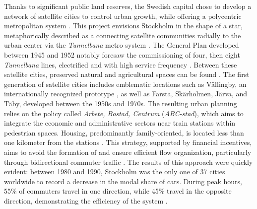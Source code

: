 \begin{refsegment}
{    Thanks to significant public land reserves, the Swedish capital chose to develop a network of satellite cities to control urban growth, while offering a polycentric metropolitan system \textcolor{blue}{\autocite[p.~109-130 (Chapter~4)]{cervero_transit_1998}}. This project envisions Stockholm in the shape of a star, metaphorically described as a  connecting satellite communities radially to the urban center via the \textsl{Tunnelbana} metro system \textcolor{blue}{\autocite[111]{pojani_past_2018}}. The General Plan developed between 1945 and 1952 notably foresaw the commissioning of four, then eight \textsl{Tunnelbana} lines, electrified and with high service frequency \textcolor{blue}{\autocite[4]{knowles_transports_2020}}. Between these satellite cities, preserved natural and agricultural spaces can be found \textcolor{blue}{\autocite[1-63]{strong_planned_1971}}. The first generation of satellite cities includes emblematic locations such as Vällingby, an internationally recognized prototype \textcolor{blue}{\autocite[23]{gullberg_city-building_2004}}, as well as Farsta, Skärholmen, Järva, and Täby, developed between the 1950s and 1970s. The resulting urban planning relies on the policy called \textsl{Arbete, Bostad, Centrum} (\textsl{ABC-stad}), which aims to integrate the economic and administrative sectors near train stations within pedestrian spaces. Housing, predominantly family-oriented, is located less than one kilometer from the stations \textcolor{blue}{\autocite[112]{pojani_past_2018}}. This strategy, supported by financial incentives, aims to avoid the formation of  and ensure efficient flow organization, particularly through bidirectional commuter traffic \textcolor{blue}{\autocites[43]{cervero_sustainable_1995}[22]{gullberg_city-building_2004}}. The results of this approach were quickly evident: between 1980 and 1990, Stockholm was the only one of 37 cities worldwide to record a decrease in the modal share of cars. During peak hours, 55\% of commuters travel in one direction, while 45\% travel in the opposite direction, demonstrating the efficiency of the system \textcolor{blue}{\autocites[705]{kenworthy_patterns_1999}[24]{curtis_transit_2009}}.
}
\end{refsegment}
